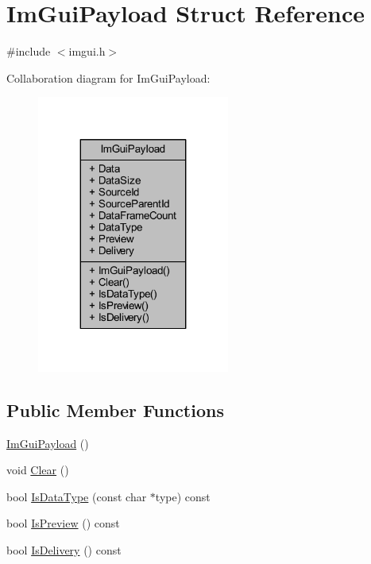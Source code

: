 \hypertarget{struct_im_gui_payload}{}\section{Im\+Gui\+Payload Struct Reference}
\label{struct_im_gui_payload}


{\ttfamily \#include $<$imgui.\+h$>$}



Collaboration diagram for Im\+Gui\+Payload\+:
\nopagebreak
\begin{figure}[H]
\begin{center}
\leavevmode
\includegraphics[width=179pt]{struct_im_gui_payload__coll__graph}
\end{center}
\end{figure}
\subsection*{Public Member Functions}
\begin{DoxyCompactItemize}
\item 
\mbox{\hyperlink{struct_im_gui_payload_a341c0039af838af0308a7449f8c1308b}{Im\+Gui\+Payload}} ()
\item 
void \mbox{\hyperlink{struct_im_gui_payload_a88c2293d356eb05e7a30d7693de186f2}{Clear}} ()
\item 
bool \mbox{\hyperlink{struct_im_gui_payload_a7864aeb80bc28683748d015562eead4d}{Is\+Data\+Type}} (const char $\ast$type) const
\item 
bool \mbox{\hyperlink{struct_im_gui_payload_a4a7e17de25fd86c5ada447aaec412070}{Is\+Preview}} () const
\item 
bool \mbox{\hyperlink{struct_im_gui_payload_adcc193e0d454bf394e76e5498eea808d}{Is\+Delivery}} () const
\end{DoxyCompactItemize}
